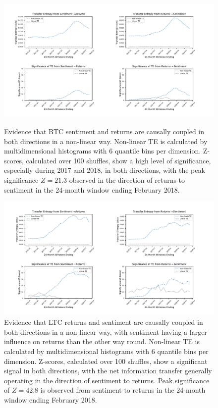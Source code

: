\documentclass[]{rsos}%
\begin{document}
  \begin{figure}[!htbp]
    \includegraphics[width=\linewidth]{images/BTC.pdf}
    \caption{Evidence that BTC sentiment and {\color{blue} returns} are causally coupled in both directions in a non-linear way. Non-linear TE is calculated by multidimensional histograms with 6 quantile bins per dimension. Z-scores, calculated over 100 shuffles, show a high level of significance, especially during 2017 and 2018, in both directions, with the peak significance $Z=21.3$ observed in the direction of {\color{blue} returns} to sentiment in the 24-month window ending February 2018.}
    \label{fig:BTC_TE}
  
    \includegraphics[width=\linewidth]{images/LTC.pdf} 
    \caption{Evidence that LTC {\color{blue} returns} and sentiment are causally coupled in both directions in a non-linear way, with sentiment having a larger influence on {\color{blue} returns} than the other way round. Non-linear TE is calculated by multidimensional histograms with 6 quantile bins per dimension. Z-scores, calculated over 100 shuffles, show a significant signal in both directions, with the net information transfer generally operating in the direction of sentiment to {\color{blue} returns}. Peak significance of $Z=42.8$ is observed from sentiment to {\color{blue} returns} in the 24-month window ending February 2018.}
    \label{fig:LTC_TE}
    \vspace{-4pt}
  \end{figure}
\end{document}
